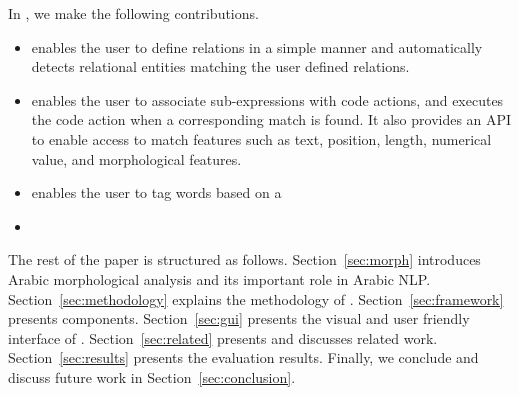 In \framework, we make the following contributions.
\begin{itemize}
  \item \framework enables the user to define relations in a simple manner
    and automatically detects relational entities matching the user defined relations. 
  \item \framework enables the user to associate sub-expressions
    with code actions, and executes the code action 
    when a corresponding match is found.
    It also provides an API to enable access to match 
    features such as text, position, length, numerical value, and morphological features.
  \item \framework enables the user to tag words based on a 

  \item {}
\end{itemize}

The rest of the paper is structured as follows.
Section~\ref{sec:morph} introduces Arabic morphological analysis 
and its important role in Arabic NLP.
Section~\ref{sec:methodology} explains the methodology of \framework.
Section~\ref{sec:framework} presents \framework components.
Section~\ref{sec:gui} presents the visual and user friendly interface of \framework. 
Section~\ref{sec:related} presents and discusses related work.
Section~\ref{sec:results} presents the evaluation results. 
Finally, we conclude and discuss future work in Section~\ref{sec:conclusion}.
